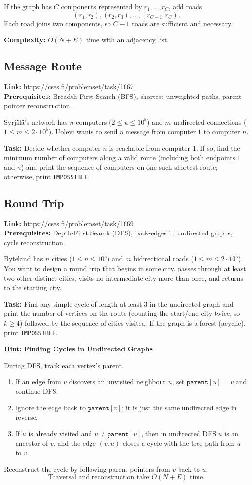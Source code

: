 \documentclass[12pt]{article}
\begin{document}
If the graph has $C$ components represented by $r_1, \dots, r_C$, add roads
\[(r_1,r_2), (r_2,r_3), \dots, (r_{C-1},r_C).\]
Each road joins two components, so $C-1$ roads are sufficient and necessary.

\textbf{Complexity:} $O(N+E)$ time with an adjacency list.

\subsection{Message Route}
\textbf{Link:} \url{https://cses.fi/problemset/task/1667} \\
\textbf{Prerequisites:} Breadth-First Search (BFS), shortest unweighted paths, parent pointer reconstruction.

Syrj{\"a}l{\"a}'s network has $n$ computers ($2 \le n \le 10^5$) and $m$ undirected connections ($1 \le m \le 2 \cdot 10^5$). Uolevi wants to send a message from computer $1$ to computer $n$.

\textbf{Task:} Decide whether computer $n$ is reachable from computer $1$. If so, find the minimum number of computers along a valid route (including both endpoints $1$ and $n$) and print the sequence of computers on one such shortest route; otherwise, print \texttt{IMPOSSIBLE}.

\subsection{Round Trip}
\textbf{Link:} \url{https://cses.fi/problemset/task/1669} \\
\textbf{Prerequisites:} Depth-First Search (DFS), back-edges in undirected graphs, cycle reconstruction.

Byteland has $n$ cities ($1 \le n \le 10^5$) and $m$ bidirectional roads ($1 \le m \le 2 \cdot 10^5$). You want to design a round trip that begins in some city, passes through at least two other distinct cities, visits no intermediate city more than once, and returns to the starting city.

\textbf{Task:} Find any simple cycle of length at least $3$ in the undirected graph and print the number of vertices on the route (counting the start/end city twice, so $k \ge 4$) followed by the sequence of cities visited. If the graph is a forest (acyclic), print \texttt{IMPOSSIBLE}.

\textbf{Hint: Finding Cycles in Undirected Graphs}

During DFS, track each vertex's parent.
\begin{enumerate}
    \item If an edge from $v$ discovers an unvisited neighbour $u$, set $\texttt{parent}[u]=v$ and continue DFS.
    \item Ignore the edge back to $\texttt{parent}[v]$; it is just the same undirected edge in reverse.
    \item If $u$ is already visited and $u \neq \texttt{parent}[v]$, then in undirected DFS $u$ is an ancestor of $v$, and the edge $(v,u)$ closes a cycle with the tree path from $u$ to $v$.
\end{enumerate}
Reconstruct the cycle by following parent pointers from $v$ back to $u$.
\[\text{Traversal and reconstruction take }O(N+E)\text{ time.}\]
\end{document}
